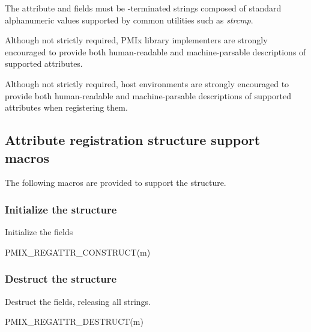 The attribute  and  fields must be -terminated strings composed of standard alphanumeric values supported by common utilities such as \textit{strcmp}.

\adviceimplstart
Although not strictly required, \ac{PMIx} library implementers are strongly encouraged to provide both human-readable and machine-parsable descriptions of supported attributes.
\adviceimplend

\advicermstart
Although not strictly required, host environments are strongly encouraged to provide both human-readable and machine-parsable descriptions of supported attributes when registering them.
\advicermend


\subsection{Attribute registration structure support macros}
The following macros are provided to support the  structure.

\subsubsection{Initialize the  structure}

Initialize the  fields

\cspecificstart
\begin{codepar}
PMIX_REGATTR_CONSTRUCT(m)
\end{codepar}
\cspecificend

\begin{arglist}
\end{arglist}

\subsubsection{Destruct the  structure}

Destruct the  fields, releasing all strings.

\cspecificstart
\begin{codepar}
PMIX_REGATTR_DESTRUCT(m)
\end{codepar}
\cspecificend

